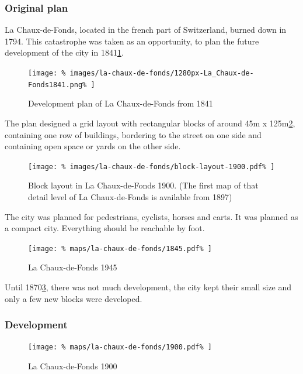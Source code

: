 \documentclass[twocolumn]{article}
\begin{document}
		
			\subsubsection{Original plan}
			La Chaux-de-Fonds, located in the french part of Switzerland, burned down in 1794.
			This catastrophe was taken as an opportunity, to plan the future development of the city in 1841\ref{fig:map:plan-la-chaux-de-fonds-1841}.
		
			\begin{figure}[h!]
				\texttt{[image: \%
					images/la-chaux-de-fonds/1280px-La\_Chaux-de-Fonds1841.png\%
				]}
				\caption{Development plan of La Chaux-de-Fonds from 1841\cite{Wikimedia:LaChauxDeFonds1841}}
				\label{fig:map:plan-la-chaux-de-fonds-1841}
			\end{figure}
			
			
			The plan designed a grid layout with rectangular blocks of around 45m x 125m\ref{fig:img:la-chaux-de-fonds-block-layout-1900}, containing one row of buildings, bordering to the street on one side and containing open space or yards on the other side.
			
			\begin{figure}[h!]
				\texttt{[image: \%
					images/la-chaux-de-fonds/block-layout-1900.pdf\%
				]}
				\caption{Block layout in La Chaux-de-Fonds 1900\cite{MapGeoAdmin:LaChauxDeFonds}. (The first map of that detail level of La Chaux-de-Fonds is available from 1897)}
				\label{fig:img:la-chaux-de-fonds-block-layout-1900}
			\end{figure}
			
			
			The city was planned for pedestrians, cyclists, horses and carts.
			It was planned as a compact city. Everything should be reachable by foot.
			
			
			\begin{figure}[h]
				\texttt{[image: \%
					maps/la-chaux-de-fonds/1845.pdf\%
				]}
				\caption{La Chaux-de-Fonds 1945\cite{MapGeoAdmin:LaChauxDeFonds}}
				\label{fig:map:la-chaux-de-fonds-1945}
			\end{figure}
			
			Until 1870\ref{fig:map:la-chaux-de-fonds-1945}, there was not much development, the city kept their small size and only a few new blocks were developed.
			
			
			\subsubsection{Development}
			\begin{figure}[h!]
				\texttt{[image: \%
					maps/la-chaux-de-fonds/1900.pdf\%
				]}
				\caption{La Chaux-de-Fonds 1900\cite{MapGeoAdmin:LaChauxDeFonds}}
				\label{fig:map:la-chaux-de-fonds-1900}
			\end{figure}
			
\end{document}
